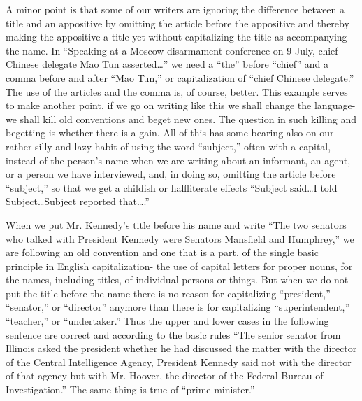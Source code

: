 \documentclass[
    oneside,
    11pt,
    draft
]{memoir}
\begin{document}
A minor point is that some of our writers are ignoring the difference between a title and an appositive by omitting the article before the appositive and thereby making the appositive a title yet without capitalizing the title as accompanying the name. In \enquote{Speaking at a Moscow disarmament conference on 9 July, chief Chinese delegate Mao Tun asserted\dots} we need a \enquote{the} before \enquote{chief} and a comma before and after \enquote{Mao Tun,} or capitalization of \enquote{chief Chinese delegate.} The use of the articles and the comma is, of course, better. This example serves to make another point, if we go on writing like this we shall change the language-we shall kill old conventions and beget new ones. The question in such killing and begetting is whether there is a gain. All of this has some bearing also on our rather silly and lazy habit of using the word \enquote{subject,} often with a capital, instead of the person's name when we are writing about an informant, an agent, or a person we have interviewed, and, in doing so, omitting the article before \enquote{subject,} so that we get a childish or halfliterate effects \enquote{Subject said\dots I told Subject\dots Subject reported that\dots.} 

When we put Mr. Kennedy's title before his name and write \enquote{The two senators who talked with President Kennedy were Senators Mansfield and Humphrey,} we are following an old convention and one that is a part, of the single basic principle in English capitalization- the use of capital letters for proper nouns, for the names, including titles, of individual persons or things. But when we do not put the title before the name there is no reason for capitalizing \enquote{president,} \enquote{senator,} or \enquote{director} anymore than there is for capitalizing \enquote{superintendent,} \enquote{teacher,} or \enquote{undertaker.} Thus the upper and lower cases in the following sentence are correct and according to the basic rules \enquote{The senior senator from Illinois asked the president whether he had discussed the matter with the director of the Central Intelligence Agency, President Kennedy said not with the director of that agency but with Mr. Hoover, the director of the Federal Bureau of Investigation.} The same thing is true of \enquote{prime minister.} 
\end{document}
